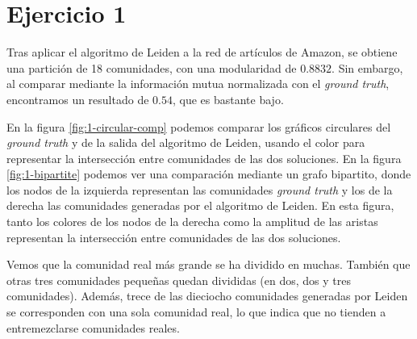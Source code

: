 \section{Ejercicio 1}\label{sec:ej1}

Tras aplicar el algoritmo de Leiden a la red de artículos de Amazon, se obtiene
una partición de 18 comunidades, con una modularidad de $0.8832$. Sin embargo,
al comparar mediante la información mutua normalizada con el \emph{ground truth},
encontramos un resultado de $0.54$, que es bastante bajo.

En la figura \ref{fig:1-circular-comp} podemos comparar los gráficos circulares
del \emph{ground truth} y de la salida del algoritmo de Leiden, usando el color
para representar la intersección entre comunidades de las dos soluciones. En la
figura \ref{fig:1-bipartite} podemos ver una comparación mediante un grafo
bipartito, donde los nodos de la izquierda representan las comunidades
\emph{ground truth} y los de la derecha las comunidades generadas por el
algoritmo de Leiden. En esta figura, tanto los colores de los nodos de la derecha
como la amplitud de las aristas representan la intersección entre comunidades de
las dos soluciones.

Vemos que la comunidad real más grande se ha dividido en muchas. También que
otras tres comunidades pequeñas quedan divididas (en dos, dos y tres
comunidades). Además, trece de las dieciocho comunidades generadas por Leiden
se corresponden con una sola comunidad real, lo que indica que no tienden
a entremezclarse comunidades reales.

